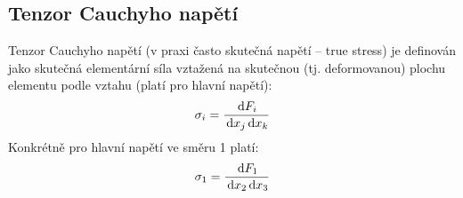 
\subsection{Tenzor Cauchyho napětí}
Tenzor Cauchyho napětí (v praxi často skutečná napětí -- true stress) je definován jako skutečná elementární síla vztažená na skutečnou (tj. deformovanou) plochu elementu podle vztahu (platí pro hlavní napětí):
\begin{equation}
	\sigma_i = \frac{\,\mathrm{d} F_i}{\,\mathrm{d} x_j \,\mathrm{d} x_k}
\end{equation}
Konkrétně pro hlavní napětí ve směru 1 platí:
\begin{equation}
	\sigma_1 = \frac{\,\mathrm{d} F_1}{\,\mathrm{d} x_2 \,\mathrm{d} x_3}
\end{equation}
